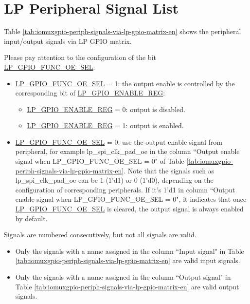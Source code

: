 \documentclass[main\_\_EN.tex]{subfiles}
\begin{document}
\section{LP Peripheral Signal List}
\label{sec:lp_peripheral_signals}
Table \ref{tab:iomuxgpio-periph-signals-via-lp-gpio-matrix-en} shows the peripheral input/output signals via LP GPIO matrix.

Please pay attention to the configuration of the bit \hyperref[fielddesc:LPGPIOFUNCNOESEL]{LP\_GPIO\_FUNC\_OE\_SEL}:

\begin{itemize}
    \item \hyperref[fielddesc:LPGPIOFUNCNOESEL]{LP\_GPIO\_FUNC\_OE\_SEL} = 1: the output enable is controlled by the corresponding bit of \hyperref[regdesc:LPGPIOENABLEREG]{LP\_GPIO\_ENABLE\_REG}:
    \begin{itemize}
        \item \hyperref[regdesc:LPGPIOENABLEREG]{LP\_GPIO\_ENABLE\_REG} = 0: output is disabled.
        \item \hyperref[regdesc:LPGPIOENABLEREG]{LP\_GPIO\_ENABLE\_REG} = 1: output is enabled.
    \end{itemize}
    \item \hyperref[fielddesc:LPGPIOFUNCNOESEL]{LP\_GPIO\_FUNC\_OE\_SEL} = 0: use the output enable signal from peripheral, for example lp\_spi\_clk\_pad\_oe in the column ``Output enable signal when LP\_GPIO\_FUNC\_OE\_SEL = 0" of Table \ref{tab:iomuxgpio-periph-signals-via-lp-gpio-matrix-en}. Note that the signals such as lp\_spi\_clk\_pad\_oe can be 1 (1'd1) or 0 (1'd0), depending on the configuration of corresponding peripherals. If it's 1'd1 in column ``Output enable signal when LP\_GPIO\_FUNC\_OE\_SEL = 0", it indicates that once \hyperref[fielddesc:LPGPIOFUNCNOESEL]{LP\_GPIO\_FUNC\_OE\_SEL} is cleared, the output signal is always enabled by default.
\end{itemize}

\begin{tiplisting}
Signals are numbered consecutively, but not all signals are valid.
\vspace{-1em}
\begin{itemize}
    \item Only the signals with a name assigned in the column ``Input signal" in Table \ref{tab:iomuxgpio-periph-signals-via-lp-gpio-matrix-en} are valid input signals.
    \item Only the signals with a name assigned in the column ``Output signal" in Table \ref{tab:iomuxgpio-periph-signals-via-lp-gpio-matrix-en} are valid output signals.
\end{itemize}
\end{tiplisting}
\end{document}
